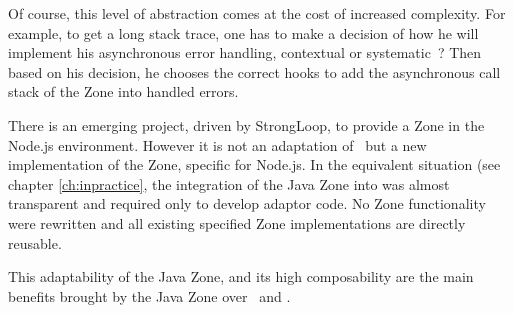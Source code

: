 Of course, this level of abstraction comes at the cost of increased complexity. For example, to get a long stack trace, one has to make a decision of how he will implement his asynchronous error handling, contextual or systematic~? Then based on his decision, he chooses the correct hooks to add the asynchronous call stack of the Zone into handled errors.

There is an emerging project, driven by StrongLoop, to provide a Zone in the Node.js environment. However it is not an adaptation of \zonejs\ but a new implementation of the Zone, specific for Node.js. In the equivalent situation (see chapter \ref{ch:inpractice}, the integration of the Java Zone into \vertx was almost transparent and required only to develop adaptor code. No Zone functionality were rewritten and all existing specified Zone implementations are directly reusable.

This adaptability of the Java Zone, and its high composability are the main benefits brought by the Java Zone over \zonejs\ and \zonedrt.
